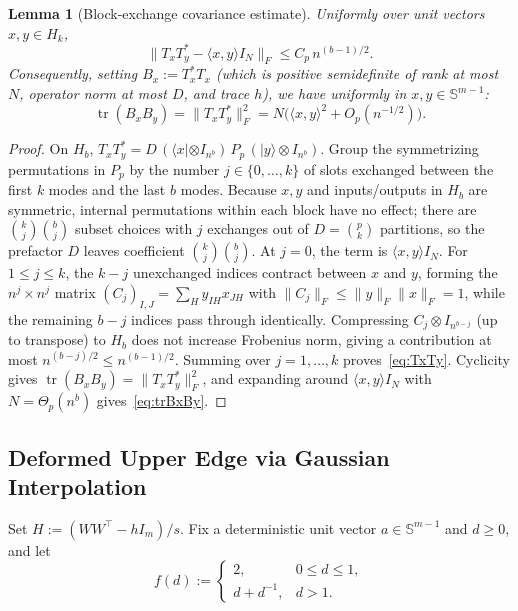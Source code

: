 \documentclass[11pt]{article}
\theoremstyle{plain}
\newtheorem{lemma}[theorem]{Lemma}
\theoremstyle{definition}
\theoremstyle{remark}
\DeclareMathOperator{\tr}{tr}
\begin{document}
\begin{lemma}[Block-exchange covariance estimate]\label{lem:exchange}
Uniformly over unit vectors $x, y \in H_k$,
\begin{equation}\label{eq:TxTy}
\|T_x T_y^* - \langle x, y \rangle I_N\|_F \le C_p\, n^{(b-1)/2}.
\end{equation}
Consequently, setting $B_x := T_x^* T_x$ (which is positive semidefinite of rank at most $N$, operator norm at most $D$, and trace $h$), we have uniformly in $x, y \in \mathbb{S}^{m-1}$:
\begin{equation}\label{eq:trBxBy}
\tr(B_x B_y) = \|T_x T_y^*\|_F^2 = N\bigl(\langle x, y \rangle^2 + O_p(n^{-1/2})\bigr).
\end{equation}
\end{lemma}

\begin{proof}
On $H_b$, $T_x T_y^* = D\,(\langle x| \otimes I_{n^b})\, P_p\, (|y\rangle \otimes I_{n^b})$. Group the symmetrizing permutations in $P_p$ by the number $j \in \{0, \dots, k\}$ of slots exchanged between the first $k$ modes and the last $b$ modes. Because $x, y$ and inputs/outputs in $H_b$ are symmetric, internal permutations within each block have no effect; there are $\binom{k}{j}\binom{b}{j}$ subset choices with $j$ exchanges out of $D = \binom{p}{k}$ partitions, so the prefactor $D$ leaves coefficient $\binom{k}{j}\binom{b}{j}$.
At $j = 0$, the term is $\langle x, y \rangle I_N$.
For $1 \le j \le k$, the $k - j$ unexchanged indices contract between $x$ and $y$, forming the $n^j \times n^j$ matrix $(C_j)_{I,J} = \sum_H y_{IH} x_{JH}$ with $\|C_j\|_F \le \|y\|_F \|x\|_F = 1$, while the remaining $b - j$ indices pass through identically. Compressing $C_j \otimes I_{n^{b-j}}$ (up to transpose) to $H_b$ does not increase Frobenius norm, giving a contribution at most $n^{(b-j)/2} \le n^{(b-1)/2}$. Summing over $j = 1, \dots, k$ proves~\eqref{eq:TxTy}. Cyclicity gives $\tr(B_x B_y) = \|T_x T_y^*\|_F^2$, and expanding around $\langle x, y \rangle I_N$ with $N = \Theta_p(n^b)$ gives~\eqref{eq:trBxBy}.
\end{proof}

\subsection{Deformed Upper Edge via Gaussian Interpolation}

Set $H := (W W^\top - h I_m) / s$. Fix a deterministic unit vector $a \in \mathbb{S}^{m-1}$ and $d \ge 0$, and let
\[
f(d) := \begin{cases}
2, & 0 \le d \le 1,\\
d + d^{-1}, & d > 1.
\end{cases}
\]
\end{document}
